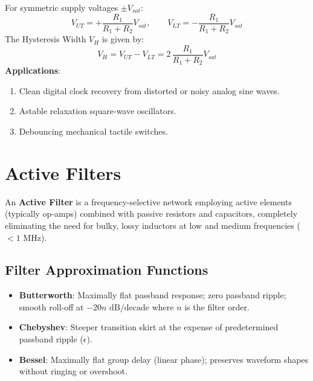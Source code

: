 \documentclass[12pt,a4paper]{article}
\begin{document}
\begin{tcolorbox}[formulabox, title={Threshold and Hysteresis Equations}]
For symmetric supply voltages $\pm V_{sat}$:
\begin{equation}
  V_{UT} = +\frac{R_1}{R_1 + R_2} V_{sat}, \qquad V_{LT} = -\frac{R_1}{R_1 + R_2} V_{sat}
\end{equation}
The Hysteresis Width $V_H$ is given by:
\begin{equation}
  V_H = V_{UT} - V_{LT} = 2\,\frac{R_1}{R_1 + R_2} V_{sat}
\end{equation}
\textbf{Applications}:
\begin{enumerate}[leftmargin=14pt, itemsep=2pt, topsep=2pt]
  \item Clean digital clock recovery from distorted or noisy analog sine waves.
  \item Astable relaxation square-wave oscillators.
  \item Debouncing mechanical tactile switches.
\end{enumerate}
\end{tcolorbox}

\section{Active Filters}

\begin{tcolorbox}[defbox, title={Definition: Active Filter}]
An \textbf{Active Filter} is a frequency-selective network employing active elements (typically op-amps) combined with passive resistors and capacitors, completely eliminating the need for bulky, lossy inductors at low and medium frequencies ($< 1\text{ MHz}$).
\end{tcolorbox}

\subsection{Filter Approximation Functions}
\begin{itemize}[leftmargin=12pt, itemsep=3pt, topsep=2pt]
  \item \textbf{Butterworth}: Maximally flat passband response; zero passband ripple; smooth roll-off at $-20n\text{ dB/decade}$ where $n$ is the filter order.
  \item \textbf{Chebyshev}: Steeper transition skirt at the expense of predetermined passband ripple ($\epsilon$).
  \item \textbf{Bessel}: Maximally flat group delay (linear phase); preserves waveform shapes without ringing or overshoot.
\end{itemize}
\end{document}
